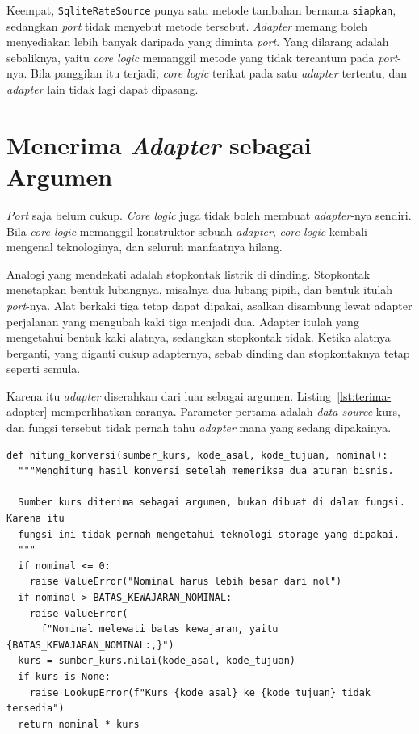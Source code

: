 Keempat, \texttt{SqliteRateSource} punya satu metode tambahan bernama
\texttt{siapkan}, sedangkan \textit{port} tidak menyebut metode tersebut.
\textit{Adapter} memang boleh menyediakan lebih banyak daripada yang diminta
\textit{port}. Yang dilarang adalah sebaliknya, yaitu \textit{core logic}
memanggil metode yang tidak tercantum pada \textit{port}-nya. Bila panggilan
itu terjadi, \textit{core logic} terikat pada satu \textit{adapter} tertentu,
dan \textit{adapter} lain tidak lagi dapat dipasang.

\section{Menerima \textit{Adapter} sebagai Argumen}

\textit{Port} saja belum cukup. \textit{Core logic} juga tidak boleh membuat
\textit{adapter}-nya sendiri. Bila \textit{core logic} memanggil konstruktor
sebuah \textit{adapter}, \textit{core logic} kembali mengenal teknologinya, dan
seluruh manfaatnya hilang.

Analogi yang mendekati adalah stopkontak listrik di dinding. Stopkontak
menetapkan bentuk lubangnya, misalnya dua lubang pipih, dan bentuk itulah
\textit{port}-nya. Alat berkaki tiga tetap dapat dipakai, asalkan disambung
lewat adapter perjalanan yang mengubah kaki tiga menjadi dua. Adapter itulah
yang mengetahui bentuk kaki alatnya, sedangkan stopkontak tidak. Ketika alatnya
berganti, yang diganti cukup adapternya, sebab dinding dan stopkontaknya tetap
seperti semula.

Karena itu \textit{adapter} diserahkan dari luar sebagai argumen.
Listing~\ref{lst:terima-adapter} memperlihatkan caranya. Parameter pertama
adalah \textit{data source} kurs, dan fungsi tersebut tidak pernah tahu
\textit{adapter} mana yang sedang dipakainya.

\begin{lstlisting}[style=PythonStyle, caption={Adapter diterima sebagai argumen,
  tersedia di \berkas{sources/chapter04/domain.py}}, label=lst:terima-adapter]
def hitung_konversi(sumber_kurs, kode_asal, kode_tujuan, nominal):
  """Menghitung hasil konversi setelah memeriksa dua aturan bisnis.

  Sumber kurs diterima sebagai argumen, bukan dibuat di dalam fungsi. Karena itu
  fungsi ini tidak pernah mengetahui teknologi storage yang dipakai.
  """
  if nominal <= 0:
    raise ValueError("Nominal harus lebih besar dari nol")
  if nominal > BATAS_KEWAJARAN_NOMINAL:
    raise ValueError(
      f"Nominal melewati batas kewajaran, yaitu {BATAS_KEWAJARAN_NOMINAL:,}")
  kurs = sumber_kurs.nilai(kode_asal, kode_tujuan)
  if kurs is None:
    raise LookupError(f"Kurs {kode_asal} ke {kode_tujuan} tidak tersedia")
  return nominal * kurs
\end{lstlisting}

